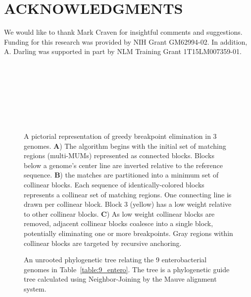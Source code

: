 \documentclass[titlepage,11pt]{article}
\begin{document}
\section*{ ACKNOWLEDGMENTS }
We would like to thank Mark Craven for insightful comments and suggestions.
Funding for this research was provided by NIH Grant GM62994-02.
In addition, A. Darling was supported in part by NLM Training Grant
1T15LM007359-01.
\\
\\
\\
\\
\\
\\
\\
\\


\begin{figure}
\centering
{}
\caption{\label{fig:coalescent}
A pictorial representation of greedy breakpoint elimination in 3 genomes.
\textbf{A})  The algorithm
begins with the initial set of matching regions (multi-MUMs) represented as
connected blocks. Blocks below a genome's center line are inverted relative to the reference
sequence.
\textbf{B}) the matches are partitioned into a minimum set of
collinear blocks.  Each sequence of identically-colored blocks represents a
collinear set of matching regions.  One connecting line is drawn per collinear block.
Block 3 (yellow) has a low weight relative to other collinear blocks.
\textbf{C}) As low weight collinear blocks are removed, adjacent collinear
blocks coalesce into a single block, potentially eliminating one or more
breakpoints.  Gray regions within collinear blocks are targeted by recursive anchoring.
}
\end{figure}

\begin{figure}
\centering
{}
\bibfont
\caption{\label{fig:entero_tree} An unrooted phylogenetic tree
relating the 9 enterobacterial genomes in Table~\ref{table:9_entero}.  The tree
is a phylogenetic guide tree calculated using Neighbor-Joining by the Mauve alignment system.}
\end{figure}
\end{document}

